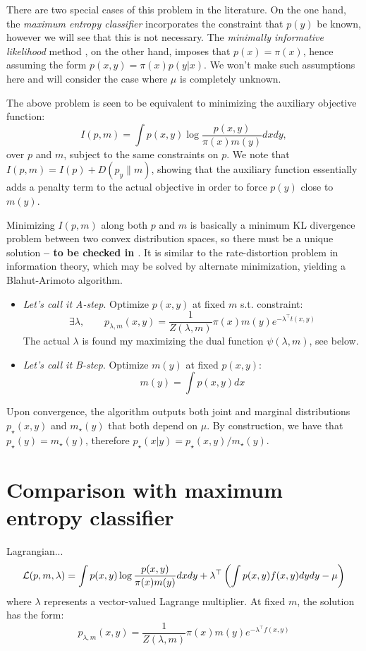 \documentclass[english]{scrartcl}
\begin{document}
There are two special cases of this problem in the literature.  On the
one hand, the {\em maximum entropy classifier} \cite{BergerA-96}
incorporates the constraint that $p(y)$ be known, however we will see
that this is not necessary. The {\em minimally informative likelihood}
method \cite{Yuan-99b,Yuan-99}, on the other hand, imposes that
$p(x)=\pi(x)$, hence assuming the form $p(x,y)=\pi(x)p(y|x)$. We won't
make such assumptions here and will consider the case where $\mu$ is
completely unknown.

The above problem is seen to be equivalent to minimizing the auxiliary
objective function:
$$
I(p,m) 
= \int p(x,y) \log \frac{p(x,y)}{\pi(x)m(y)} dxdy,
$$ over $p$ and $m$, subject to the same constraints on $p$. We note
that $I(p,m)=I(p)+D(p_y\|m)$, showing that the auxiliary function
essentially adds a penalty term to the actual objective in order to
force $p(y)$ close to $m(y)$.

Minimizing $I(p,m)$ along both $p$ and $m$ is basically a minimum KL
divergence problem between two convex distribution spaces, so there
must be a unique solution {\bf -- to be checked in
  \cite{Cover-91}}. It is similar to the rate-distortion problem in
information theory, which may be solved by alternate minimization,
yielding a Blahut-Arimoto algorithm.
\begin{itemize}
\item {\em Let's call it A-step}. Optimize $p(x,y)$ at fixed $m$
  s.t. constraint:
$$
\exists \lambda, \qquad
p_{\lambda,m}(x,y) = \frac{1}{Z(\lambda, m)} \pi(x) m(y) e^{-\lambda^\top t(x,y)}
$$
The actual $\lambda$ is found my maximizing the dual function
$\psi(\lambda,m)$, see below.
\item {\em Let's call it B-step}. Optimize $m(y)$ at fixed $p(x,y)$:
$$
m(y) = \int p(x,y) dx
$$
\end{itemize}

Upon convergence, the algorithm outputs both joint and marginal
distributions $p_{\star}(x,y)$ and $m_{\star}(y)$ that both depend on
$\mu$. By construction, we have that $p_{\star}(y) = m_{\star}(y)$,
therefore $p_\star(x|y)=p_{\star}(x,y)/m_{\star}(y)$.


\section{Comparison with maximum entropy classifier}

Lagrangian...
$$
{\cal L}(p,m,\lambda)
= 
\int p(x,y) \log \frac{p(x,y)}{\pi(x)m(y)} dxdy
+
\lambda^\top \left( 
\int p(x,y) f(x,y) dydy - \mu 
\right)
$$ where $\lambda$ represents a vector-valued Lagrange multiplier. At
fixed $m$, the solution has the form:
$$
p_{\lambda,m}(x,y) = \frac{1}{Z(\lambda,m)}
\pi(x) m(y) e^{-\lambda^\top f(x,y)} 
$$
\end{document}
